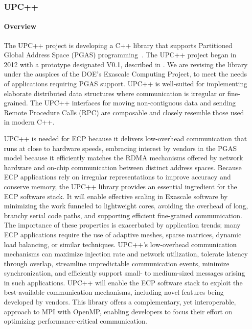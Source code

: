 \subsubsection{ UPC++} 
\paragraph{Overview} 
The UPC++ project is developing a C++ library
that supports Partitioned Global Address Space (PGAS) programming~\cite{Bachan:paw17}.
The UPC++ project began in 2012 with a prototype designated V0.1, described in \cite{zheng:ipdps14}.
We are revising the library under the auspices of the DOE's Exascale Computing
Project, to meet the needs of applications requiring PGAS support.
UPC++ is well-suited for implementing elaborate distributed data structures where
communication is irregular or fine-grained. The UPC++ interfaces for
moving non-contiguous data and sending Remote Procedure Calls (RPC)
are composable and closely resemble those used in modern C++.

UPC++ is needed for ECP because it delivers low-overhead communication that runs
at close to hardware speeds, embracing 
interest by vendors in the PGAS model because it 
efficiently matches the RDMA mechanisms offered by
network hardware and on-chip communication between distinct address
spaces.  
Because ECP applications rely on irregular representations
to improve accuracy and conserve memory, the UPC++ library provides
an essential ingredient for the ECP software stack.  It will enable
effective scaling in Exascale software by minimizing the work funneled
to lightweight cores, avoiding the overhead of long, branchy serial
code paths, and supporting efficient fine-grained communication.  The
importance of these properties is exacerbated by application trends;
many ECP applications require the use of adaptive meshes, sparse
matrices, dynamic load balancing, or similar techniques.  UPC++'s
low-overhead communication mechanisms can maximize injection rate and
network utilization, tolerate latency through overlap, streamline
unpredictable communication events, minimize synchronization, and
efficiently support small- to medium-sized messages arising in such
applications.  UPC++ will enable the ECP software stack to exploit
the best-available communication mechanisms, including novel features
being developed by vendors.  This library offers a complementary,
yet interoperable, approach to MPI with OpenMP, enabling developers to
focus their effort on optimizing performance-critical communication.

